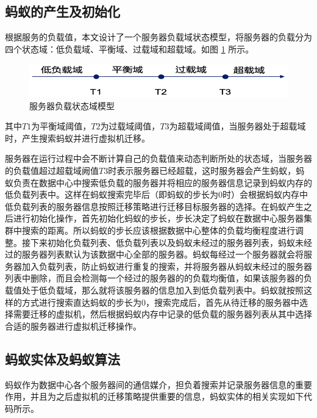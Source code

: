 \subsection{蚂蚁的产生及初始化}
根据服务的负载值，本文设计了一个服务器负载域状态模型，将服务器的负载分为四个状态域：低负载域、平衡域、过载域和超载域。如图 \ref{Fig:chap3_4} 所示。

\begin{figure}[htb]
  \centering
  \includegraphics{./Figure/IMG_Chap3_4.png}
  \caption{服务器负载状态域模型}\label{Fig:chap3_4}
\end{figure}

其中$ T1 $为平衡域阈值，$ T2 $为过载域阈值，$ T3 $为超载域阈值，当服务器处于超载域时，产生搜索蚂蚁并进行虚拟机迁移\cite{王光波}。

服务器在运行过程中会不断计算自己的负载值来动态判断所处的状态域，当服务器的负载值超过超载域阙值$ T3 $时表示服务器已经超载，这时服务器会产生蚂蚁，蚂蚁负责在数据中心中搜索低负载的服务器并将相应的服务器信息记录到蚂蚁内存的低负载列表中。这样在蚂蚁搜索完毕后（即蚂蚁的步长为0时）会根据蚂蚁内存中低负载列表的服务器信息按照迁移策略进行迁移目标服务器的选择。在蚂蚁产生之后进行初始化操作，首先初始化蚂蚁的步长，步长决定了蚂蚁在数据中心服务器集群中搜索的距离。所以蚂蚁的步长应该根据数据中心整体的负载均衡程度进行调整。接下来初始化负载列表、低负载列表以及蚂蚁未经过的服务器列表，蚂蚁未经过的服务器列表默认为该数据中心全部的服务器。蚂蚁每经过一个服务器就会将服务器加入负载列表，防止蚂蚁进行重复的搜索，并将服务器从蚂蚁未经过的服务器列表中删除，而且会检测每一个经过的服务器的的负载均衡值，如果该服务器的负载值处于低负载域，那么就将该服务器的信息加入到低负载列表中。蚂蚁就按照这样的方式进行搜索直达蚂蚁的步长为0，搜索完成后，首先从待迁移的服务器中选择需要迁移的虚拟机，然后根据蚂蚁内存中记录的低负载的服务器列表从其中选择合适的服务器进行虚拟机迁移操作。

\subsection{蚂蚁实体及蚂蚁算法}
蚂蚁作为数据中心各个服务器间的通信媒介，担负着搜索并记录服务器信息的重要作用，并且为之后虚拟机的迁移策略提供重要的信息，蚂蚁实体的相关实现如下代码所示。

